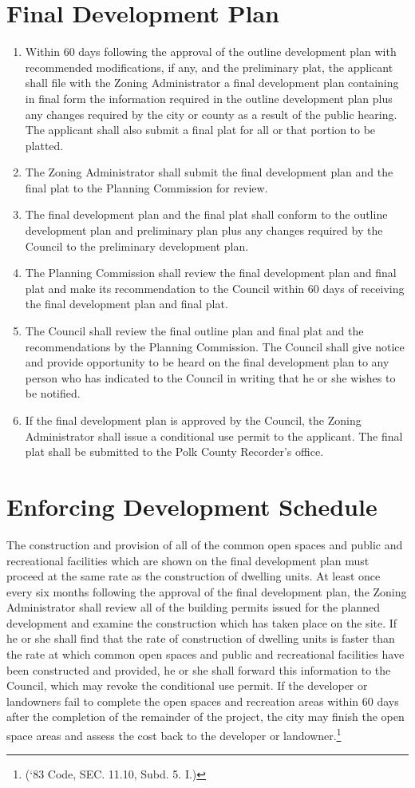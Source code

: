 \section{Final Development Plan}
\begin{enumerate}[{\indent}A)]
    \item Within 60 days following the approval of the outline development plan with recommended modifications, if any, and the preliminary plat, the applicant shall file with the Zoning Administrator a final development plan containing in final form the information required in the outline development plan plus any changes required by the city or county as a result of the public hearing. The applicant shall also submit a final plat for all or that portion to be platted.
    \item The Zoning Administrator shall submit the final development plan and the final plat to the Planning Commission for review.
    \item The final development plan and the final plat shall conform to the outline development plan and preliminary plan plus any changes required by the Council to the preliminary development plan.
    \item The Planning Commission shall review the final development plan and final plat and make its recommendation to the Council within 60 days of receiving the final development plan and final plat.
    \item The Council shall review the final outline plan and final plat and the recommendations by the Planning Commission. The Council shall give notice and provide opportunity to be heard on the final development plan to any person who has indicated to the Council in writing that he or she wishes to be notified.
    \item If the final development plan is approved by the Council, the Zoning Administrator shall issue a conditional use permit to the applicant. The final plat shall be submitted to the Polk County Recorder’s office.
\end{enumerate}
\section{Enforcing Development Schedule}
The construction and provision of all of the common open spaces and public and recreational facilities which are shown on the final development plan must proceed at the same rate as the construction of dwelling units. At least once every six months following the approval of the final development plan, the Zoning Administrator shall review all of the building permits issued for the planned development and examine the construction which has taken place on the site. If he or she shall find that the rate of construction of dwelling units is faster than the rate at which common open spaces and public and recreational facilities have been constructed and provided, he or she shall forward this information to the Council, which may revoke the conditional use permit. If the developer or landowners fail to complete the open spaces and recreation areas within 60 days after the completion of the remainder of the project, the city may finish the open space areas and assess the cost back to the developer or landowner.\footnote{(‘83 Code, SEC. 11.10, Subd. 5. I.)}
